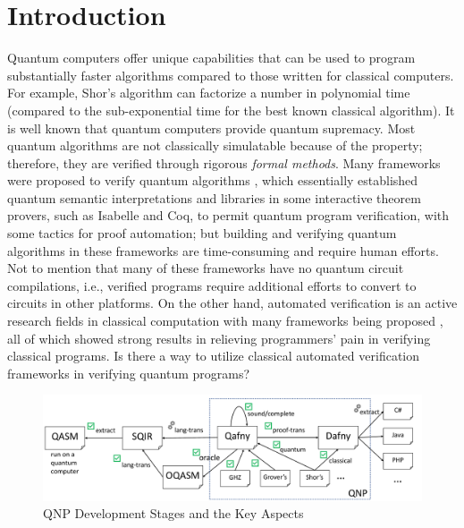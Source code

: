 \section{Introduction}
\label{sec:intro}


Quantum computers offer unique capabilities that can be used to
program substantially faster algorithms compared to those written for
classical computers.
For example, Shor's algorithm \cite{shors} can factorize a
number in polynomial time (compared to the sub-exponential time for the
best known classical algorithm).
It is well known that quantum computers provide quantum supremacy.
Most quantum algorithms are not classically simulatable because of the property;
therefore, they are verified through rigorous \emph{formal methods}.
Many frameworks were proposed to verify quantum algorithms \cite{qhoreusage,qhoare,qbricks,qsepa,qseplocal,VOQC}, 
which essentially established quantum semantic interpretations and libraries in some interactive theorem provers,
such as Isabelle and Coq, to permit quantum program verification, with some tactics for proof automation; but building and verifying quantum algorithms in these frameworks are time-consuming and require human efforts. 
Not to mention that many of these frameworks have no quantum circuit compilations,
i.e., verified programs require additional efforts to convert to circuits in other platforms. 
On the other hand, automated verification is an active research fields in classical computation with many frameworks being proposed \cite{HoareLogic,separationlogic,nat-proof-fun,nat-proof,nat-proof-frame,10.1145/3453483.3454087,arxiv.1609.00919,martioliet00rewriting,rosu-stefanescu-2011-nier-icse,rosu-stefanescu-ciobaca-moore-2013-lics,10.1007/978-3-642-17511-4_20,10.1007/978-3-642-03359-9_2}, all of which showed strong results in relieving programmers' pain in verifying classical programs. Is there a way to utilize classical automated verification frameworks in verifying quantum programs?

\vspace*{-0.5em}
\begin{figure}[h]
  \includegraphics[width=.75\textwidth]{qnp.pdf}
\vspace*{-0.5em}
  \caption{QNP Development Stages and the Key Aspects}
\label{fig:arch}
\end{figure}
\vspace*{-0.5em}

